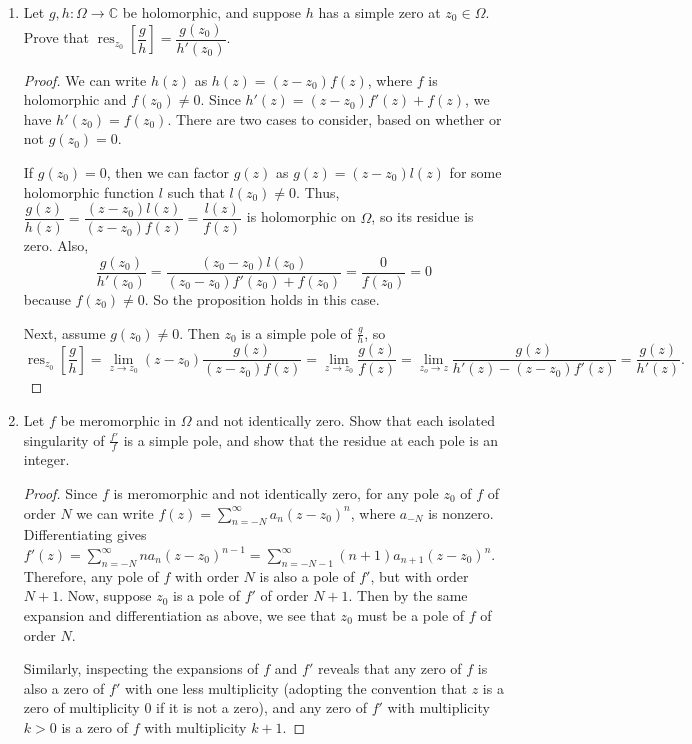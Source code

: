 \documentclass[10pt]{article}
\newcommand{\C}{\mathbb{C}}
\DeclareMathOperator*{\res}{res}
\begin{document}
\begin{enumerate}
\item Let $g,h : \Omega \rightarrow \C$ be holomorphic, and suppose $h$ has a simple zero at $z_0 \in \Omega$.  Prove that $\res_{z_0}\left[ \dfrac{g}{h} \right] = \dfrac{g(z_0)}{h'(z_0)}$.

\begin{proof}
We can write $h(z)$ as $h(z) = (z - z_0)f(z)$, where $f$ is holomorphic and $f(z_0) \neq 0$.  Since $h'(z) = (z-z_0)f'(z) + f(z)$, we have $h'(z_0) = f(z_0)$.  There are two cases to consider, based on whether or not $g(z_0) = 0$.

If $g(z_0) = 0$, then we can factor $g(z)$ as $g(z) = (z-z_0) l(z)$ for some holomorphic function $l$ such that $l(z_0) \neq 0$.  Thus, $\dfrac{g(z)}{h(z)} =  \dfrac{(z-z_0) l(z)}{(z-z_0)f(z)} = \dfrac{l(z)}{f(z)}$ is holomorphic on $\Omega$, so its residue is zero.  Also,
$$
\dfrac{g(z_0)}{h'(z_0)} = \frac{(z_0 - z_0)l(z_0)}{(z_0 - z_0)f'(z_0) + f(z_0)} = \frac{0}{f(z_0)} = 0
$$
because $f(z_0) \neq 0$.  So the proposition holds in this case.

Next, assume $g(z_0) \neq 0$.  Then $z_0$ is a simple pole of $\frac{g}{h}$, so
$$
\res\nolimits_{z_0} \left[ \frac{g}{h} \right] = \lim_{z \rightarrow z_0} (z-z_0) \frac{g(z)}{(z-z_0)f(z)} = \lim_{z \rightarrow z_0} \frac{g(z)}{f(z)} = \lim_{z_o \rightarrow z} \frac{g(z)}{h'(z) - (z-z_0)f'(z)} = \frac{g(z)}{h'(z)}.
$$
\end{proof}

\item Let $f$ be meromorphic in $\Omega$ and not identically zero.  Show that each isolated singularity of $\frac{f'}{f}$ is a simple pole, and show that the residue at each pole is an integer.

\begin{proof}
Since $f$ is meromorphic and not identically zero, for any pole $z_0$ of $f$ of order $N$ we can write $f(z) = \sum_{n = -N}^\infty a_n (z-z_0)^n$, where $a_{-N}$ is nonzero.  Differentiating gives $f'(z) = \sum_{n = -N}^\infty n a_n (z-z_0)^{n-1} = \sum_{n = -N-1}^\infty (n+1) a_{n+1} (z-z_0)^n$.  Therefore, any pole of $f$ with order $N$ is also a pole of $f'$, but with order $N+1$.  Now, suppose $z_0$ is a pole of $f'$ of order $N+1$.  Then by the same expansion and differentiation as above, we see that $z_0$ must be a pole of $f$ of order $N$.

Similarly, inspecting the expansions of $f$ and $f'$ reveals that any zero of $f$ is also a zero of $f'$ with one less multiplicity (adopting the convention that $z$ is a zero of multiplicity 0 if it is not a zero), and any zero of $f'$ with multiplicity $k>0$ is a zero of $f$ with multiplicity $k + 1$.


\end{proof}
\end{enumerate}
\end{document}

